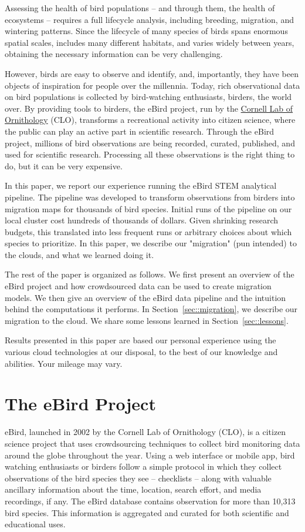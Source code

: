 \documentclass{acm_proc_article-sp}
\begin{document}
Assessing the health of bird populations -- and through them, the health of ecosystems -- requires a full lifecycle analysis, including breeding, migration, and wintering patterns. Since the lifecycle of many species of birds spans enormous spatial scales, includes many different habitats, and varies widely between years, obtaining the necessary information can be very challenging.

However, birds are easy to observe and identify, and, importantly, they have been objects of inspiration for people over the millennia. Today, rich observational data on bird populations is collected by bird-watching enthusiasts, birders, the world over. By providing tools to birders, the eBird project, run by the \href{http://www.birds.cornell.edu/}{Cornell Lab of Ornithology} (CLO), transforms a recreational activity into citizen science, where the public can play an active part in scientific research. Through the eBird project, millions of bird observations are being recorded, curated, published, and used for scientific research. Processing all these observations is the right thing to do, but it can be very expensive.

In this paper, we report our experience running the eBird STEM analytical pipeline. The pipeline was developed to transform observations from birders into migration maps for thousands of bird species. Initial runs of the pipeline on our local cluster cost hundreds of thousands of dollars. Given shrinking research budgets, this translated into less frequent runs or arbitrary choices about which species to prioritize. In this paper, we describe our "migration" (pun intended) to the clouds, and what we learned doing it.

The rest of the paper is organized as follows. We first present an overview of the eBird project and how crowdsourced data can be used to create migration models. We then give an overview of the eBird data pipeline and the intuition behind the computations it performs. In Section~\ref{sec::migration}, we describe our migration to the cloud. We share some lessons learned in Section~\ref{sec::lessons}.

Results presented in this paper are based our personal experience using the various cloud technologies at our disposal, to the best of our knowledge and abilities. Your mileage may vary.

\section{The eBird Project}\label{sec::ebird}
eBird, launched in 2002 by the Cornell Lab of Ornithology (CLO), is a citizen science project that uses crowdsourcing techniques to collect bird monitoring data around the globe throughout the year. Using a web interface or mobile app, bird watching enthusiasts or birders follow a simple protocol in which they collect observations of the bird species they see -- checklists -- along with valuable ancillary information about the time, location, search effort, and media recordings, if any. The eBird database contains observation for more than 10,313  bird species. This information is aggregated and curated for both scientific and educational uses.
\end{document}
